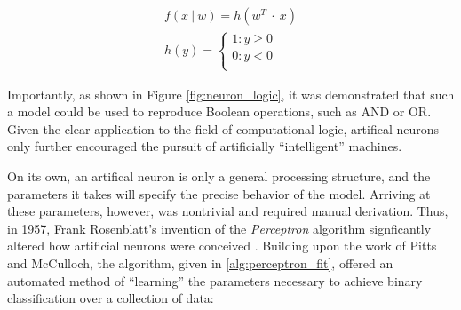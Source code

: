
\begin{align*}
  f(x~|~w) = h(w^T~\cdot~x)\\
  h(y) = \left\{
    \begin{array}{ll}
      1 : y \ge 0\\
      0 : y < 0\\
    \end{array}
  \right.
\label{eq:perceptron}
\end{align*}

\noindent Importantly, as shown in Figure \ref{fig:neuron_logic}, it was demonstrated that such a model could be used to reproduce Boolean operations, such as AND or OR.
Given the clear application to the field of computational logic, artifical neurons only further encouraged the pursuit of artificially ``intelligent'' machines.

On its own, an artifical neuron is only a general processing structure, and the parameters it takes will specify the precise behavior of the model.
Arriving at these parameters, however, was nontrivial and required manual derivation.
Thus, in 1957, Frank Rosenblatt's invention of the \emph{Perceptron} algorithm signficantly altered how artificial neurons were conceived \cite{Rosenblatt1957}.
Building upon the work of Pitts and McCulloch, the algorithm, given in \ref{alg:perceptron_fit}, offered an automated method of ``learning'' the parameters necessary to achieve binary classification over a collection of data:


